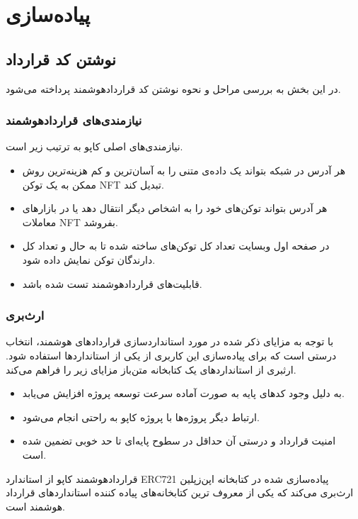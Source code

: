 \chapter{پیاده‌سازی}

\section{نوشتن کد قرارداد}
در این بخش به بررسی مراحل و نحوه نوشتن کد قراردادهوشمند پرداخته می‌شود.

\subsection{نیازمندی‌های قراردادهوشمند}
نیازمندی‌های اصلی کاپو به ترتیب زیر است.
\begin{itemize}
  \item
هر آدرس در شبکه بتواند یک داده‌ی متنی را به آسان‌ترین و کم هزینه‌ترین روش ممکن به یک توکن NFT تبدیل کند.
  \item
هر آدرس بتواند توکن‌های خود را به اشخاص دیگر انتقال دهد یا در بازارهای معاملات NFT بفروشد.
  \item
در صفحه اول وبسایت تعداد کل توکن‌های ساخته شده تا به حال و تعداد کل دارندگان توکن نمایش داده شود.
  \item
قابلیت‌های قراردادهوشمند تست شده باشد.
\end{itemize}

\subsection{ارث‌بری}
با توجه به مزایای ذکر شده در مورد استانداردسازی قراردادهای هوشمند، انتخاب درستی است که برای پیاده‌سازی این کاربری از یکی از استانداردها استفاده شود. ارثبری از استانداردهای یک کتابخانه متن‌باز مزایای زیر را فراهم می‌کند.
\begin{itemize}
  \item
به دلیل وجود کدهای پایه به صورت آماده سرعت توسعه پروژه افزایش می‌یابد.
  \item
ارتباط دیگر پروژه‌ها با پروژه کاپو به راحتی انجام می‌شود.
  \item
امنیت قرارداد و درستی آن حداقل در سطوح پایه‌ای تا حد خوبی تضمین شده است.
\end{itemize}

قراردادهوشمند کاپو از استاندارد ERC721 پیاده‌سازی شده در کتابخانه اپن‌زپلین
ارث‌بری می‌کند که یکی از معروف ترین کتابخانه‌های پیاده کننده استانداردهای قرارداد هوشمند است.

